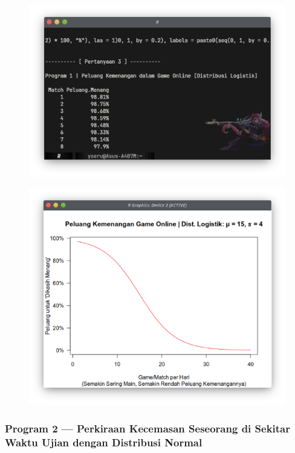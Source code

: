 \begin{figure}[H]
    \centering
    \includegraphics[width=.8\linewidth]{image/Peluang Kemenangan dalam Game Online dengan Distribusi Logistik.png}
    \vspace{-\baselineskip}
\end{figure}

\begin{figure}[H]
    \centering
    \includegraphics[width=.8\linewidth]{image/Grafik Peluang Kemenangan dalam Game Online dengan Distribusi Logistik.png}
    \vspace{-\baselineskip}
\end{figure}

\subsubsection{Program 2 --- Perkiraan Kecemasan Seseorang di Sekitar Waktu Ujian dengan Distribusi Normal}


